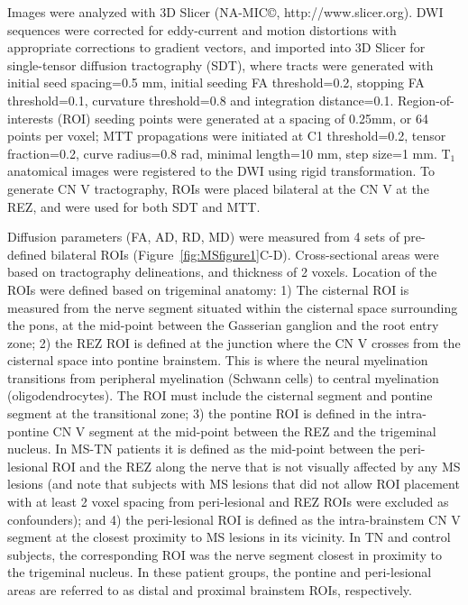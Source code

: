 Images were analyzed with 3D Slicer (NA-MIC©, http://www.slicer.org)\cite{Pieper2004}. DWI sequences were corrected for eddy-current and motion distortions with appropriate corrections to gradient vectors, and imported into 3D Slicer for single-tensor diffusion tractography (SDT), where tracts were generated with initial seed spacing=0.5 mm, initial seeding FA threshold=0.2, stopping FA threshold=0.1, curvature threshold=0.8 and integration distance=0.1. Region-of-interests (ROI) seeding points were generated at a spacing of 0.25mm, or 64 points per voxel; MTT propagations were initiated at C1 threshold=0.2, tensor fraction=0.2, curve radius=0.8 rad, minimal length=10 mm, step size=1 mm. T$_{1}$ anatomical images were registered to the DWI using rigid transformation. To generate CN V tractography, ROIs were placed bilateral at the CN V at the REZ, and were used for both SDT and MTT. 

Diffusion parameters (FA, AD, RD, MD) were measured from 4 sets of pre-defined bilateral ROIs (Figure~\ref{fig:MSfigure1}C-D). Cross-sectional areas were based on tractography delineations, and thickness of 2 voxels. Location of the ROIs were defined based on trigeminal anatomy: 1) The cisternal ROI is measured from the nerve segment situated within the cisternal space surrounding the pons, at the mid-point between the Gasserian ganglion and the root entry zone; 2) the REZ ROI is defined at the junction where the CN V crosses from the cisternal space into pontine brainstem. This is where the neural myelination transitions from peripheral myelination (Schwann cells) to central myelination (oligodendrocytes). The ROI must include the cisternal segment and pontine segment at the transitional zone; 3) the pontine ROI is defined in the intra-pontine CN V segment at the mid-point between the REZ and the trigeminal nucleus. In MS-TN patients it is defined as the mid-point between the peri-lesional ROI and the REZ along the nerve that is not visually affected by any MS lesions (and note that subjects with MS lesions that did not allow ROI placement with at least 2 voxel spacing from peri-lesional and REZ ROIs were excluded as confounders); and 4) the peri-lesional ROI is defined as the intra-brainstem CN V segment at the closest proximity to MS lesions in its vicinity. In TN and control subjects, the corresponding ROI was the nerve segment closest in proximity to the trigeminal nucleus. In these patient groups, the pontine and peri-lesional areas are referred to as distal and proximal brainstem ROIs, respectively. 

